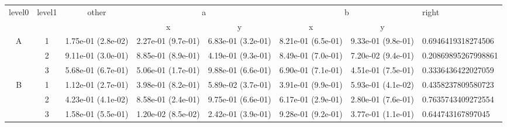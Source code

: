 \begin{tabular}{cccccccl}
\toprule
\multirow{2}{*}{level0} & \multirow{2}{*}{level1}& \multirow{2}{*}{other}&\multicolumn{2}{c}{a}&\multicolumn{2}{c}{b}& \multirow{2}{*}{right}\tabularnewline
\cmidrule(lr){4-5}
\cmidrule(lr){6-7}
&&&x&y&x&y\tabularnewline
\midrule
\multirow{3}{*}{A}&1& 1.75e-01 (2.8e-02)& 2.27e-01 (9.7e-01)& 6.83e-01 (3.2e-01)& 8.21e-01 (6.5e-01)& 9.33e-01 (9.8e-01)& 0.6946419318274506\tabularnewline
&2& 9.11e-01 (3.0e-01)& 8.85e-01 (8.9e-01)& 4.19e-01 (9.3e-01)& 8.49e-01 (7.0e-01)& 7.20e-02 (9.4e-01)& 0.20869895267998861\tabularnewline
&3& 5.68e-01 (6.7e-01)& 5.06e-01 (1.7e-01)& 9.88e-01 (6.6e-01)& 6.90e-01 (7.1e-01)& 4.51e-01 (7.5e-01)& 0.3336436422027059\tabularnewline
\midrule
\multirow{3}{*}{B}&1& 1.12e-01 (2.7e-01)& 3.98e-01 (8.2e-01)& 5.89e-02 (3.7e-01)& 3.91e-01 (9.9e-01)& 5.93e-01 (4.1e-02)& 0.4358237809580723\tabularnewline
&2& 4.23e-01 (4.1e-02)& 8.58e-01 (2.4e-01)& 9.75e-01 (6.6e-01)& 6.17e-01 (2.9e-01)& 2.80e-01 (7.6e-01)& 0.7635743409272554\tabularnewline
&3& 1.58e-01 (5.5e-01)& 1.20e-02 (8.5e-02)& 2.42e-01 (3.9e-01)& 9.28e-01 (9.2e-01)& 3.77e-01 (1.1e-01)& 0.644743167897045\tabularnewline
\bottomrule
\end{tabular}
